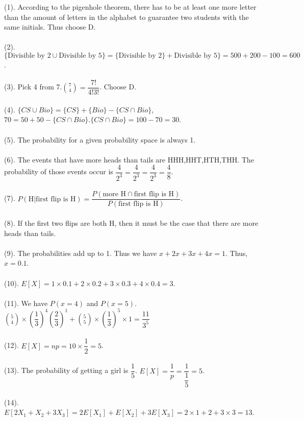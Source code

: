 \documentclass{article}
\begin{document}
\noindent (1). According to the pigenhole theorem, there has to be at least one more letter than the amount of letters in the alphabet to guarantee two students with the same initials.  Thus choose D.\\\\
(2). $\{\text{Divisible by 2} \cup \text{Divisible by 5}\} = \{\text{Divisible by 2}\}+\text{Divisible by 5}\} = 500+200-100 = 600$. \\\\
(3). Pick 4 from 7.$\binom{7}{4} = \dfrac{7!}{4!3!}$. Choose D.\\\\
(4). $\{CS \cup Bio\} = \{CS\}+\{Bio\}-\{CS \cap Bio\}$, $70 = 50+50-\{CS \cap Bio\}. \{CS \cap Bio\} = 100-70 = 30$.\\\\
(5). The probability for a given probability space is always 1.\\\\
(6). The events that have more heads than tails are HHH,HHT,HTH,THH. The probability of those events occur is $\dfrac{4}{2^3} = \dfrac{4}{2^3} = \dfrac{4}{2^3} = \dfrac{4}{8}$.\\\\
(7). $P(\text{H}|\text{first flip is H})=\dfrac{P(\text{more H} \cap \text{first flip is H})}{P(\text{first flip is H})}$. \\\\
(8). If the first two flips are both H, then it must be the case that there are more heads than tails.\\\\
(9). The probabilities add up to 1. Thus we have $x+2x+3x+4x = 1$. Thus, $x = 0.1$.\\\\
(10). $E[X] = 1 \times 0.1 + 2 \times 0.2 + 3 \times 0.3 + 4 \times 0.4 = 3$.\\\\
(11). We have $P(x = 4)$ and $P(x = 5)$. $\binom{5}{4} \times (\dfrac{1}{3})^4(\dfrac{2}{3})^1 + \binom{5}{5} \times (\dfrac{1}{3})^5 \times 1 = \dfrac{11}{3^5}$\\\\
(12). $E[X] = np = 10 \times \dfrac{1}{2} = 5$.\\\\
(13). The probability of getting a girl is $\dfrac{1}{5}$. $E[X] = \dfrac{1}{p} = \dfrac{1}{\dfrac{1}{5}} = 5$.\\\\
(14). $E[2X_1+X_2+3X_3] = 2E[X_1] + E[X_2] + 3E[X_3] = 2 \times 1 + 2 + 3 \times 3 = 13 $. \\\\
\end{document}
